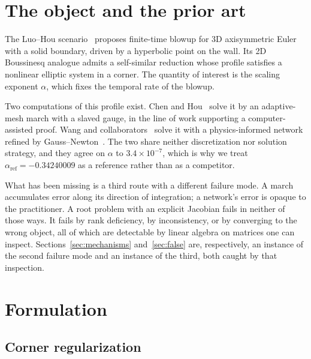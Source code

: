 \documentclass[11pt]{article}
\begin{document}
\section{The object and the prior art}

The Luo--Hou scenario~\cite{luohou} proposes finite-time blowup for 3D axisymmetric
Euler with a solid boundary, driven by a hyperbolic point on the wall. Its 2D
Boussinesq analogue admits a self-similar reduction whose profile satisfies a nonlinear
elliptic system in a corner. The quantity of interest is the scaling exponent $\alpha$,
which fixes the temporal rate of the blowup.

Two computations of this profile exist. Chen and
Hou~\cite{chenhou1,chenhou2,chenhou3} solve it by an adaptive-mesh march with a slaved
gauge, in the line of work supporting a computer-assisted proof. Wang and
collaborators~\cite{deepmind} solve it with a physics-informed network refined by
Gauss--Newton~\cite{thesis}. The two share neither discretization nor solution
strategy, and they agree on $\alpha$ to $3.4\times10^{-7}$, which is why we treat
$\alpha_{\mathrm{ref}} = -0.34240009$ as a reference rather than as a competitor.

What has been missing is a third route with a different failure mode. A march
accumulates error along its direction of integration; a network's error is opaque to
the practitioner. A root problem with an explicit Jacobian fails in neither of those
ways. It fails by rank deficiency, by inconsistency, or by converging to the wrong
object, all of which are detectable by linear algebra on matrices one can inspect.
Sections~\ref{sec:mechanisms} and~\ref{sec:false} are, respectively, an instance of the
second failure mode and an instance of the third, both caught by that inspection.

\section{Formulation}

\subsection{Corner regularization}
\end{document}

